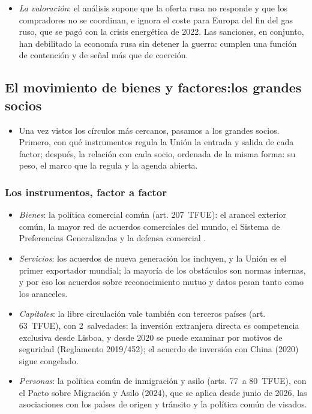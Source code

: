 \documentclass[11pt]{article}
\begin{document}
\begin{anotaciones}
\begin{itemize}
\item \emph{La valoración}: el análisis supone que la oferta rusa no responde y que los compradores no se coordinan, e ignora el coste para Europa del fin del gas ruso, que se pagó con la crisis energética de 2022\nocite{HufbauerEtAl2007}. Las sanciones, en conjunto, han debilitado la economía rusa sin detener la guerra: cumplen una función de contención y de señal más que de coerción.
\end{itemize}
\end{anotaciones}

\subsection{El movimiento de bienes y factores:\cortetitulo los grandes socios}\label{sec:socios}

\begin{itemize}
\item Una vez vistos los círculos más cercanos, pasamos a los grandes socios. Primero, con qué instrumentos regula la Unión la entrada y salida de cada factor; después, la relación con cada socio, ordenada de la misma forma: su peso, el marco que la regula y la agenda abierta.
\end{itemize}

\subsubsection{Los instrumentos, factor a factor}\label{sec:factores}

\begin{itemize}
\item \emph{Bienes}: la política comercial común (art. 207~TFUE): el arancel exterior común, la mayor red de acuerdos comerciales del mundo, el Sistema de Preferencias Generalizadas y la defensa comercial .
\item \emph{Servicios}: los acuerdos de nueva generación los incluyen, y la Unión es el primer exportador mundial; la mayoría de los obstáculos son normas internas, y por eso los acuerdos sobre reconocimiento mutuo y datos pesan tanto como los aranceles.
\item \emph{Capitales}: la libre circulación vale también con terceros países (art. 63~TFUE), con 2~salvedades: la inversión extranjera directa es competencia exclusiva desde Lisboa, y desde 2020 se puede examinar por motivos de seguridad (Reglamento 2019/452); el acuerdo de inversión con China (2020) sigue congelado\nocite{UE2016TFUE}.
\item \emph{Personas}: la política común de inmigración y asilo (arts. 77~a 80~TFUE), con el Pacto sobre Migración y Asilo (2024), que se aplica desde junio de 2026, las asociaciones con los países de origen y tránsito y la política común de visados\nocite{UE2016TFUE}.
\end{itemize}
\end{document}
